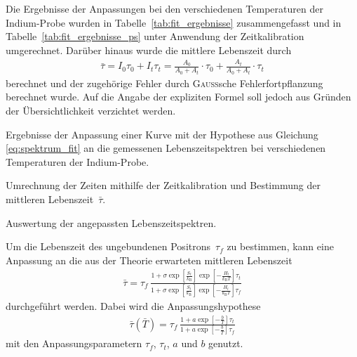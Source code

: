 \documentclass[11pt, a4paper]{article}
\numberwithin{equation}{section}
\begin{document}
Die Ergebnisse der Anpassungen bei den verschiedenen Temperaturen der Indium-Probe wurden in Tabelle~\ref{tab:fit_ergebnisse} zusammengefasst und in Tabelle~\ref{tab:fit_ergebnisse_ps} unter Anwendung der Zeitkalibration umgerechnet.
Darüber hinaus wurde die mittlere Lebenszeit durch
\begin{align*}
	\bar{\tau} = I_0 \tau_0 + I_t \tau_t = \frac{A_0}{A_0 + A_t} \cdot \tau_0 + \frac{A_t}{A_0 + A_t} \cdot \tau_t
\end{align*}
berechnet \cite{add_infos} und der zugehörige Fehler durch \textsc{Gauß}sche Fehlerfortpflanzung berechnet wurde.
Auf die Angabe der expliziten Formel soll jedoch aus Gründen der Übersichtlichkeit verzichtet werden.
\begin{table}
	\begin{subtable}{\textwidth}
		\centering
		\resizebox{\textwidth}{!}{
			
		}
		\caption{Ergebnisse der Anpassung einer Kurve mit der Hypothese aus Gleichung \eqref{eq:spektrum_fit} an die gemessenen Lebenszeitspektren bei verschiedenen Temperaturen der Indium-Probe.}
		\label{tab:fit_ergebnisse}
		\vspace*{0.8cm}
	\end{subtable}
	\begin{subtable}{\textwidth}
		\centering
		
		\caption{Umrechnung der Zeiten mithilfe der Zeitkalibration und Bestimmung der mittleren Lebenszeit~$\bar{\tau}$.}
		\label{tab:fit_ergebnisse_ps}
		\vspace*{0.5cm}
	\end{subtable}
	\caption{Auswertung der angepassten Lebenszeitspektren.}
\end{table}

Um die Lebenszeit des ungebundenen Positrons~$\tau_f$ zu bestimmen, kann eine Anpassung an die aus der Theorie erwarteten mittleren Lebenszeit 
\begin{align*}
	\bar{\tau} = \tau_f \, \frac{1 + \sigma \exp\left[ \frac{S_t}{k_\mathrm{B}} \right] \exp\left[ -\frac{H_t}{k_\mathrm{B} T} \right] \tau_t}{1 + \sigma \exp\left[ \frac{S_t}{k_\mathrm{B}} \right] \exp\left[ -\frac{H_t}{k_\mathrm{B} T} \right] \tau_f}
\end{align*}
durchgeführt werden.
Dabei wird die Anpassungshypothese
\begin{align*}
	\bar{\tau}(\bar{T}) = \tau_f \, \frac{1 + a \exp\left[ -\frac{b}{T} \right] \tau_t}{1 + a \exp\left[ -\frac{b}{T} \right] \tau_f}
\end{align*}
mit den Anpassungsparametern $\tau_f$, $\tau_t$, $a$ und $b$ genutzt.
\end{document}
